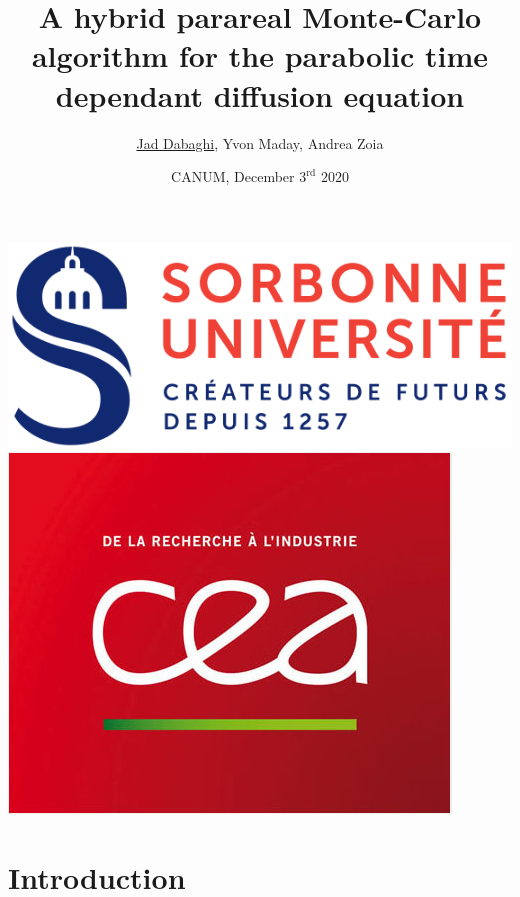 \documentclass[10 pt]{beamer}
\title[SIAM GS 2019]{A hybrid parareal Monte-Carlo algorithm for the parabolic time
dependant diffusion equation}
\author[Jad Dabaghi]
{\underline{Jad Dabaghi}, Yvon Maday, Andrea Zoia}
\institute[]{Sorbonne Université \& CEA Paris Saclay}
\date{CANUM, December $3^{\mathrm{rd}}$ $2020$}
\begin{document}
\begin{frame}
\maketitle
\includegraphics[scale=0.2]{image/logo_sorbonne}
\hfill \includegraphics[scale=0.14]{image/CEA}

\end{frame}




\newcommand{\kk}{\textcolor{royalblue}{k}}
\newcommand{\ii}{\textcolor{burntorange}{i}}
\newcommand{\nuu}{\textcolor{burntorange}{\nu}}


\setcounter{tocdepth}{4}
\section{Introduction}
\end{document}
